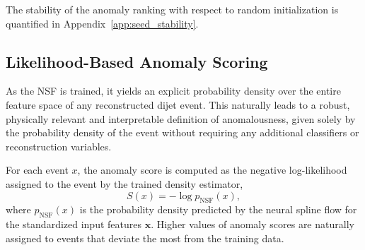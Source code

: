 \documentclass[11pt,a4paper,twocolumn]{article}
\begin{document}
The stability of the anomaly ranking with respect to random initialization is quantified in Appendix~\ref{app:seed_stability}.

\subsection{Likelihood-Based Anomaly Scoring}
\label{subsec:anomaly_scoring}

As the NSF is trained, it yields an explicit probability density over the entire feature space of any reconstructed dijet event. This naturally leads to a robust, physically relevant and interpretable definition of anomalousness, given solely by the probability density of the event without requiring any additional classifiers or reconstruction variables.

For each event $x$, the anomaly score is computed as the negative log-likelihood assigned to the event by the trained density estimator,
\begin{equation}
S(x) = -\log p_{\mathrm{NSF}}(x),
\label{eq:anomaly_score}
\end{equation}
where $p_{\mathrm{NSF}}(x)$ is the probability density predicted by the neural spline flow for the standardized input features $\mathbf{x}$. Higher values of anomaly scores are naturally assigned to events that deviate the most from the training data.
\end{document}
